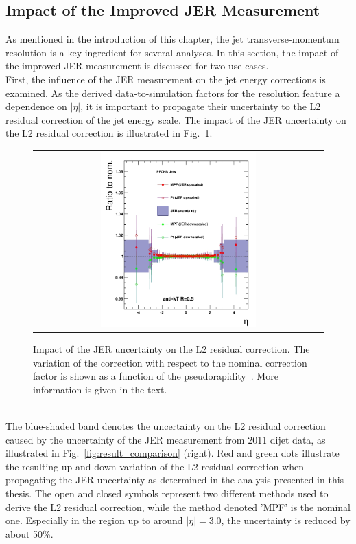 \subsection{Impact of the Improved JER Measurement}
\label{subsec:jer_results_impact}
As mentioned in the introduction of this chapter, the jet transverse-momentum resolution is a key ingredient for several analyses. In this section, the impact of the improved JER measurement is discussed for two use cases. \\
First, the influence of the JER measurement on the jet energy corrections is examined. As the derived data-to-simulation factors for the resolution feature a dependence on $|\eta|$, it is important to propagate their uncertainty to the L2 residual correction of the jet energy scale. The impact of the JER uncertainty on the L2 residual correction is illustrated in Fig.~\ref{fig:result_jec_impact}.  
\begin{figure}[!h]
  \centering
  \begin{tabular}{c}
                \includegraphics[width=0.55\textwidth]{figures/newJER_L2V4_L3fixed-ratio_mod.jpg} 
  \end{tabular}
  \caption{Impact of the JER uncertainty on the L2 residual correction. The variation of the correction with respect to the nominal correction factor is shown as a function of the pseudorapidity~\cite{DRathjens}. More information is given in the text.}
  \label{fig:result_jec_impact}
\end{figure}
\\
The blue-shaded band denotes the uncertainty on the L2 residual correction caused by the uncertainty of the JER measurement from 2011 dijet data, as illustrated in Fig.~\ref{fig:result_comparison} (right). Red and green dots illustrate the resulting up and down variation of the L2 residual correction when propagating the JER uncertainty as determined in the analysis presented in this thesis. The open and closed symbols represent two different methods used to derive the L2 residual correction, while the method denoted 'MPF' is the nominal one. Especially in the region up to around $|\eta| = 3.0$, the uncertainty is reduced by about 50\%. 
